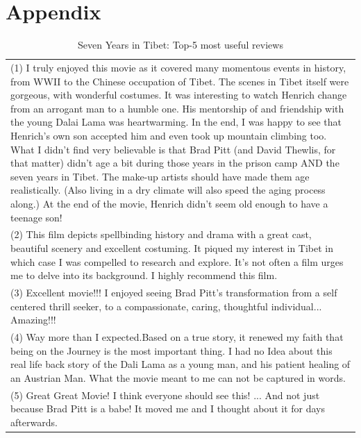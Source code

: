 \documentclass[runningheads,a4paper]{llncs}
\begin{document}
\section{Appendix}\label{_Ref490292581}
\begin{table}[h!]
\centering

\cprotect\caption{  Seven Years in Tibet: Top-5 most useful reviews}
\renewcommand{\tabularxcolumn}[1]{>{\arraybackslash}m{#1}}

\scalebox{0.8} {\begin{tabularx}{1.22\textwidth}{ >{\hsize}Y }
\toprule

{\bf Seven Years in Tibet - Reviews} \\
 \toprule

(1) I truly enjoyed this movie as it covered many momentous events in history, from WWII to the Chinese occupation of Tibet. The scenes in Tibet itself were gorgeous, with wonderful costumes. It was interesting to watch Henrich change from an arrogant man to a humble one. His mentorship of and friendship with the young Dalai Lama was heartwarming.  In the end, I was happy to see that Henrich's own son accepted him and even took up mountain climbing too. What I didn't find very believable is that Brad Pitt (and David Thewlis, for that matter) didn't age a bit during those years in the prison camp AND the seven years in Tibet. The make-up artists should have made them age realistically. (Also living in a dry climate will also speed the aging process along.) At the end of the movie, Henrich didn't seem old enough to have a teenage son! \\
 \midrule

(2) This film depicts spellbinding history and drama with a great cast, beautiful scenery and excellent costuming. It piqued my interest in Tibet in which case I was compelled to research and explore. It's not often a film urges me to delve into its background. I highly recommend this film. \\
 \midrule

(3) Excellent movie!!! I enjoyed seeing Brad Pitt's transformation from a self centered thrill seeker, to a compassionate, caring, thoughtful individual... Amazing!!! \\
 \midrule

(4) Way more than I expected.Based on a true story, it renewed my faith that being on the Journey is the most important thing. I had no Idea about this real life back story of the Dali Lama as a young man, and his patient healing of an Austrian Man. What the movie meant to me can not be captured in words. \\
 \midrule

(5) Great Great Movie! I think everyone should see this! ... And not just because Brad Pitt is a babe! It moved me and I thought about it for days afterwards. \\
 \bottomrule

\end{tabularx}}

\label{}
\end{table}
\end{document}
